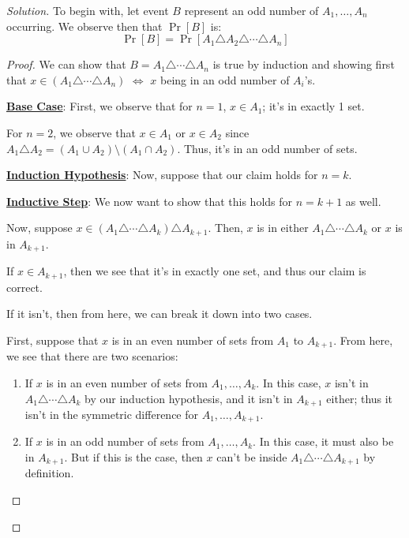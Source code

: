 \documentclass{article}
\newenvironment{solution}{\begin{proof}[Solution]}{\end{proof}}
\begin{document}
\begin{solution}
	To begin with, let event $B$ represent an odd number of $A_{1}, \ldots, A_{n}$ occurring. We observe then that $\Pr[B]$ is:
	\begin{equation*}
		\Pr[B] = \Pr[A_{1} \triangle A_{2} \triangle \cdots \triangle A_{n}]
	\end{equation*}

\begin{proof}
	We can show that $B = A_{1} \triangle \cdots \triangle A_{n}$ is true by induction and showing first that $x \in (A_{1} \triangle \cdots \triangle A_{n})$ $\iff$ $x$ being in an odd number of $A_{i}$'s.
	
	\textbf{\underline{Base Case}}: First, we observe that for $n=1$, $x \in A_{1}$; it's in exactly 1 set.
	
	For $n=2$, we observe that $x \in A_{1}$ or $x \in A_{2}$ since $A_{1} \triangle A_{2} = (A_{1} \cup A_{2}) \setminus (A_{1} \cap A_{2})$. Thus, it's in an odd number of sets.
	
	\textbf{\underline{Induction Hypothesis}}: Now, suppose that our claim holds for $n=k$.
	
	\textbf{\underline{Inductive Step}}: We now want to show that this holds for $n=k+1$ as well.
	
	Now, suppose $x \in (A_{1} \triangle \cdots \triangle A_{k}) \triangle A_{k+1}$. Then, $x$ is in either $A_{1} \triangle \cdots \triangle A_{k}$ or $x$ is in $A_{k+1}$.
	
	If $x \in A_{k+1}$, then we see that it's in exactly one set, and thus our claim is correct.
	
	If it isn't, then from here, we can break it down into two cases.
	
	First, suppose that $x$ is in an even number of sets from $A_{1}$ to $A_{k+1}$. From here, we see that there are two scenarios:
	\begin{enumerate}
		\item If $x$ is in an even number of sets from $A_{1}, \ldots, A_{k}$. In this case, $x$ isn't in $A_{1} \triangle \cdots \triangle A_{k}$ by our induction hypothesis, and it isn't in $A_{k+1}$ either; thus it isn't in the symmetric difference for $A_{1}, \ldots, A_{k+1}$.
		
		\item If $x$ is in an odd number of sets from $A_{1}, \ldots, A_{k}$. In this case, it must also be in $A_{k+1}$. But if this is the case, then $x$ can't be inside $A_{1} \triangle \cdots \triangle A_{k+1}$ by definition.
	\end{enumerate}
	

\end{proof}
\end{solution}
\end{document}

